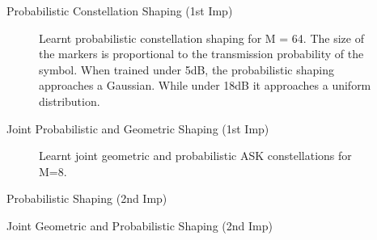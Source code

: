 \documentclass[english,aspectratio=1610,9pt,helvet,nicetitles]{ICEbeamerTUMCD}
\begin{document}
\begin{frame}{Probabilistic Constellation Shaping (1st Imp)}
\begin{figure}
	\subfigure[5dB]{
		
		\label{subfig:stark_pcs_5db}
	}
	\subfigure[18db]{
		
		\label{subfig:stark_pcs_18db}
	}
	\caption{Learnt probabilistic constellation shaping for M = 64. The size of the markers is proportional to the transmission probability of the symbol. When trained under 5dB, the probabilistic shaping approaches a Gaussian. While under 18dB it approaches a uniform distribution. }
\end{figure}
\end{frame}

\begin{frame}{Joint Probabilistic and Geometric Shaping (1st Imp)}
\begin{figure}[h]
	\subfigure[SNR = 5dB]{
         
         \label{subfig:stark5dB}
    }
    \subfigure[SNR = 18dB]{
         
         \label{subfig:stark18dB}
    }
    \caption{Learnt joint geometric and probabilistic ASK constellations for M=8.}
    \label{fig:starkMASK}
\end{figure}
\end{frame}



\begin{frame}{Probabilistic Shaping (2nd Imp)}
	

\end{frame}

\begin{frame}{Joint Geometric and Probabilistic Shaping (2nd Imp)}
	
\end{frame}

\end{document}
